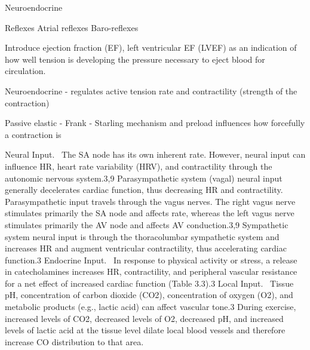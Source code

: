 Neuroendocrine

Reflexes
Atrial reflexes
Baro-reflexes


Introduce ejection fraction (EF), left ventricular EF (LVEF) as an indication of how well tension is developing the pressure necessary to eject blood for circulation.

Neuroendocrine - regulates active tension rate and contractility (strength of the contraction)

Passive elastic - Frank - Starling mechanism and preload influences how forcefully a contraction is

Neural Input. 
The SA node has its own inherent rate. However, neural input can influence HR, heart rate variability (HRV), and contractility through the autonomic nervous system.3,9
Parasympathetic system (vagal) neural input generally decelerates cardiac function, thus decreasing HR and contractility. Parasympathetic input travels through the vagus nerves. The right vagus nerve stimulates primarily the SA node and affects rate, whereas the left vagus nerve stimulates primarily the AV node and affects AV conduction.3,9
Sympathetic system neural input is through the thoracolumbar sympathetic system and increases HR and augment ventricular contractility, thus accelerating cardiac function.3
Endocrine Input. 
In response to physical activity or stress, a release in catecholamines increases HR, contractility, and peripheral vascular resistance for a net effect of increased cardiac function (Table 3.3).3
Local Input. 
Tissue pH, concentration of carbon dioxide (CO2), concentration of oxygen (O2), and metabolic products (e.g., lactic acid) can affect vascular tone.3 During exercise, increased levels of CO2, decreased levels of O2, decreased pH, and increased levels of lactic acid at the tissue level dilate local blood vessels and therefore increase CO distribution to that area.

